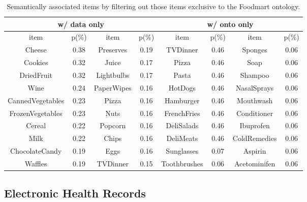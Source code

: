


\begin{table}[tbh]\scriptsize
\begin{center}
\begin{tabular}{ c c | c c || c c | c c }
\hline
\multicolumn{4}{c||}{w/ data only}  &   \multicolumn{4}{c}{w/ onto only}\\
\hline
item	&	p(\%)	&	item	&	p(\%)	&	item	&	p(\%)	&	item	&	p(\%)	\\
\hline
Cheese	&	0.38	&	Preserves	&	0.19	&	TVDinner	&	0.46	&	Sponges	&	0.06	\\
Cookies	&	0.32	&	Juice	&	0.17	&	Pizza	&	0.46	&	Soap	&	0.06	\\
DriedFruit	&	0.32	&	Lightbulbs	&	0.17	&	Pasta	&	0.46	&	Shampoo	&	0.06	\\
Wine	&	0.24	&	PaperWipes	&	0.16	&	HotDogs	&	0.46	&	NasalSprays	&	0.06	\\
CannedVegetables	&	0.23	&	Pizza	&	0.16	&	Hamburger	&	0.46	&	Mouthwash	&	0.06	\\
FrozenVegetables	&	0.23	&	Nuts	&	0.16	&	FrenchFries	&	0.46	&	Conditioner	&	0.06	\\
Cereal	&	0.22	&	Popcorn	&	0.16	&	DeliSalads	&	0.46	&	Ibuprofen	&	0.06	\\
Milk	&	0.22	&	Chips	&	0.16	&	DeliMeats	&	0.46	&	ColdRemedies	&	0.06	\\
ChocolateCandy	&	0.19	&	Eggs	&	0.16	&	Sunglasses	&	0.07	&	Aspirin	&	0.06	\\
Waffles	&	0.19	&	TVDinner	&	0.15	&	Toothbrushes	&	0.06	&	Acetominifen	&	0.06	\\					
\hline
\end{tabular}
\end{center}
\caption{\label{tbl:foodmart_comp2} Semantically associated items by filtering out those items exclusive to the Foodmart ontology.}
\end{table}


\subsection{Electronic Health Records}
